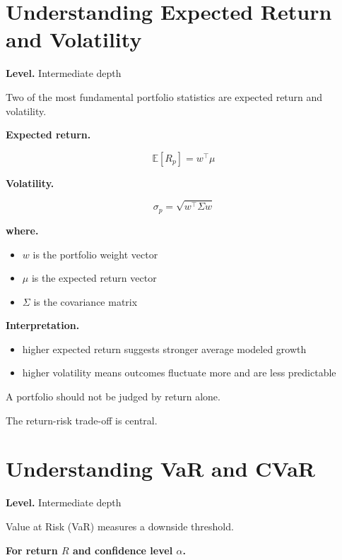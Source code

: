 \documentclass[11pt]{report}
\begin{document}
\section{Understanding Expected Return and Volatility}
\begin{callout}
\textbf{Level.} Intermediate depth
\end{callout}

Two of the most fundamental portfolio statistics are expected return and volatility.

\textbf{Expected return.}

\begin{equation}
\mathbb{E}[R_p] = w^\top \mu
\end{equation}

\textbf{Volatility.}

\begin{equation}
\sigma_p = \sqrt{w^\top \Sigma w}
\end{equation}

\textbf{where.}

\begin{itemize}
\item $w$ is the portfolio weight vector
\item $\mu$ is the expected return vector
\item $\Sigma$ is the covariance matrix
\end{itemize}

\textbf{Interpretation.}

\begin{itemize}
\item higher expected return suggests stronger average modeled growth
\item higher volatility means outcomes fluctuate more and are less predictable
\end{itemize}

A portfolio should not be judged by return alone.

The return-risk trade-off is central.

\section{Understanding VaR and CVaR}
\begin{callout}
\textbf{Level.} Intermediate depth
\end{callout}

Value at Risk (VaR) measures a downside threshold.

\textbf{For return $R$ and confidence level $\alpha$.}
\end{document}
